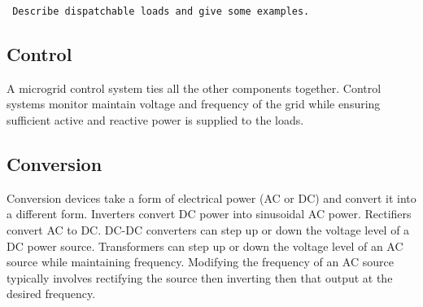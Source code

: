 \begin{verbatim} 
 Describe dispatchable loads and give some examples. 
\end{verbatim}

\subsection{Control}
A microgrid control system ties all the other components together. Control systems monitor maintain voltage and frequency of the grid while ensuring sufficient active and reactive power is supplied to the loads.

\subsection{Conversion}
Conversion devices take a form of electrical power (AC or DC) and convert it into a different form. Inverters convert DC power into sinusoidal AC power. Rectifiers convert AC to DC. DC-DC converters can step up or down the voltage level of a DC power source. Transformers can step up or down the voltage level of an AC source while maintaining frequency. Modifying the frequency of an AC source typically involves rectifying the source then inverting then that output at the desired frequency.

